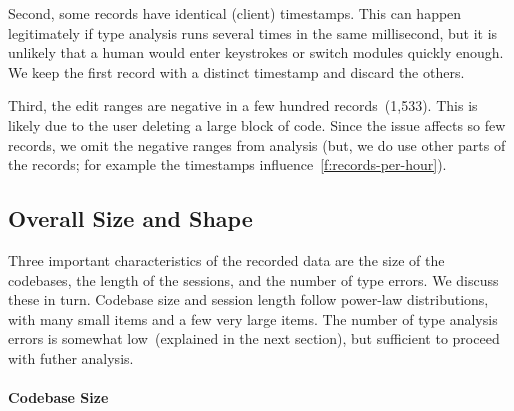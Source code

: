 \documentclass[english,submission,cleveref]{programming}
\begin{document}
Second, some records have identical (client) timestamps.
This can happen legitimately if type analysis runs several times
in the same millisecond, but it is unlikely that a human would
enter keystrokes or switch modules quickly enough.
We keep the first record with a distinct timestamp and discard the others.

Third, the edit ranges are negative in a few hundred records~(1,533).
This is likely due to the user deleting a large block of code.
Since the issue affects so few records, we omit the negative ranges
from analysis (but, we do use other parts of the records; for example
the timestamps influence~\cref{f:records-per-hour}).

\subsection{Overall Size and Shape}

Three important characteristics of the recorded data are the size of the codebases,
the length of the sessions, and the number of type
errors.
We discuss these in turn.
Codebase size and session length follow power-law
distributions, with
many small items and a few very large items.
The number of type analysis errors is somewhat low~(explained in the next
section), but sufficient to proceed with futher analysis.


\paragraph{Codebase Size}
\end{document}
